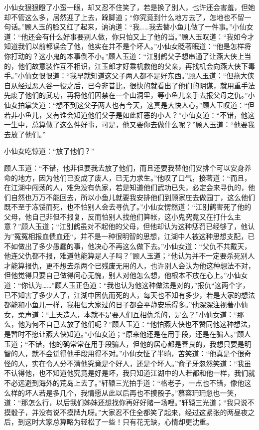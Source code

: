 \documentclass[12pt,oneside]{book}
\begin{document}
小仙女狠狠瞪了小蛮一眼，却又忍不住笑了，若是换了别人，也许还会害羞，但她却不管这么多，居然迎了上去，跺脚道；``你究竟到什么地方去了，怎地也不留一句话。''顾人玉的脸又红了起来，讷讷道：``我\ldots\ldots 我去替小鱼儿做了一件事。''小仙女道：``他还会有什么好事要别人做，你只怕又上了他的当。''顾人玉叹道：``我如今才知道我们以前都误会了他，他实在并不是个坏人。''小仙女眨著眠道：``他是怎样将你打动的？这小鬼的本事倒不小。''顾人玉道：``江别鹤父子想串通了让燕大侠上当的，他们故意装作互不相识，江玉郎才好乘机救他的父亲，再找机会向燕大侠下毒手。''小仙女恨恨道：``我早就知道这父子两人都不是好东西。''顾人玉道：``但燕大侠自从经过恶人谷一役之后，已今非昔比，很快的就看出了他们的阴谋，就用重手法先废了他们的武功，再将他们囚禁在一个山洞里，等小鱼儿亲手去报父母之仇。''小仙女拍掌笑道：``想不到这父子两人也有今天，这真是大快人心。''顾人玉叹道：``但若非小鱼儿，又有谁会知道他们父子是如此奸恶的小人？''小仙女道：``不错，他这一生中，总算做了这么件好事，可是，他又要你去做什么呢？''顾人玉道：``他要我去放了他们。''

小仙女吃惊道：``放了他们？''

顾人玉道：``不错，他非但要我去放了他们，而且还要我替他们安排个可以安身养命的地方，因为他们已变成了废人，已无力求生。''他叹了口气，接著道：``而且，在江湖中闯荡的人，难免没有仇家，若是知道他们武功已失，必定会来寻仇的，他们自然也万万不能回去，所以小鱼儿就要我安排他们到顾家庄去做园丁，这么他们既不至于冻馁而死，也不怕别人会去寻仇了。''小仙女愣然道：``江别鹤害死了他的父母，他自己非但不报复，反而怕别人找他们算帐，这小鬼究竟又在打什么主意？''顾人玉道；``江别鹤虽对不起他的父母，但他却认为这种惩罚已经够了，他认为''冤冤相报血债血还``，并不是一种很明智的思想，江湖中人被这种思想支配，已不如做出了多少愚蠢的事，他决心不再这么做下去。''小仙女道：``父仇不共戴天，他连父仇都不报，难道他能算是人子吗？''顾人玉道；``他认为并不一定要杀死别人才能算报仇，更不想去杀两个已残废无用的人，也许别人会认为他这种想法不对，但他觉得只要自己做得问心无愧，别人对他怎么想，他根本不放在心上。''小仙女道：``你认为\ldots\ldots{}''顾人玉正色道：``我也认为他这种做法是对的，''报仇``这两个字，已不知害了多少人了，江湖中因仇而死的人，每天也不知有多少，若是大家的想法都能和小鱼儿一样，我相信大家过的日子都会平静安乐得多。''他深深注视著小仙女，柔声道：``上天造人，本就不是要人们互相仇杀的，是么？''小仙女道：``那么，他为何不自己去放了他们呢？''顾人玉道：``他怕燕大侠也不赞同他这种想法，是暂时不愿让燕大侠知道。''小仙女道；``原来他还是在用手段，还是在骗人。''顾人玉道；``不错，他的确常常在用手段骗人，但他的居心都是善良的，我想只要是明智的人，就不会觉得他手段用得不对。''小仙女怔了半晌，苦笑道：``他真是个很奇怪的人，实在令人分不清他究竟是个好人，还是个坏人。''俞子牙忽然笑道：``我虽不认得他，也不知道他究竟是好是坏，我只知道江湖中的人若都和他一样，我们就不必远避到海外的荒岛上去了。''轩辕三光拍手道：``格老子，一点也不错，像他这么样的坏人若是多几个，我情愿从此以后再也不摸骰子。''慕容珊珊忽也一笑，道：``那怎么行，以后我们姊妹还想找你再好好赌一场哩。''轩辕三光道；``我只说不摸骰子，并没有说不摸牌九呀。''大家忍不住全都笑了起来，经过这紧张的两昼夜之后，到这时大家总算略为轻松了一些！只有花无缺，心情却更沈重。
\end{document}
